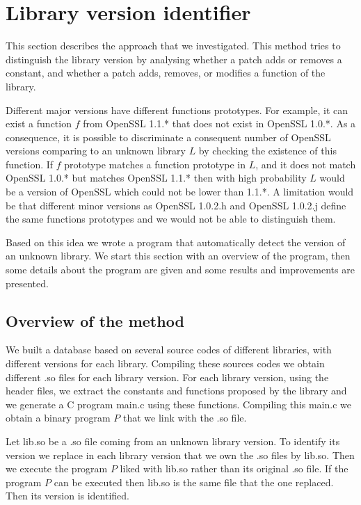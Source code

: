 \documentclass{article}
\begin{document}
\section{Library version identifier}
\label{section:libraryChecker}

    This section describes the approach that we investigated. This method
    tries to distinguish the library version by analysing whether a patch adds
    or removes a constant, and whether a patch adds, removes, or modifies a
    function of the library.
	   
    Different major versions have different functions prototypes. For example,
    it can exist a function $f$ from OpenSSL 1.1.* that does not exist in
    OpenSSL 1.0.*. As a consequence, it is possible to discriminate a
    consequent number of OpenSSL versions comparing to an unknown library $L$ by checking the existence
    of this function. If $f$ prototype matches a function prototype in $L$,
    and it does not match OpenSSL 1.0.* but matches OpenSSL 1.1.* then with
    high probability $L$ would be a version of OpenSSL which could not be
    lower than 1.1.*. A limitation would be that different minor
    versions as OpenSSL 1.0.2.h and OpenSSL 1.0.2.j define the same functions
    prototypes and we would not be able to distinguish them.
   
    Based on this idea we wrote a program that automatically detect the version of an
    unknown library. We start this section with an overview of the program, then
    some details about the program are given and some results and improvements are
    presented.

	\subsection{Overview of the method}
   
    We built a database based on several source codes of different libraries,
    with different versions for each library. Compiling these sources codes we
    obtain different .so files for each library version. For each library
    version, using the header files, we extract the constants and functions
    proposed by the library and we generate a C program main.c using these
    functions.  Compiling this main.c we obtain a binary program $P$ that we
    link with the .so file.

    Let lib.so be a .so file coming from an unknown library version. To
    identify its version we replace in each library version that we own the
    .so files by lib.so. Then we execute the program $P$ liked with lib.so
    rather than its original .so file.  If the program $P$ can be executed
    then lib.so is the same file that the one replaced. Then its version is
    identified.
 
\end{document}
